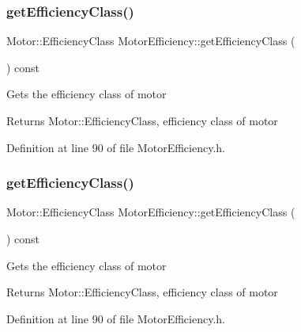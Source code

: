 \subsubsection{\texorpdfstring{get\+Efficiency\+Class()}{getEfficiencyClass()}\hspace{0.1cm}{\footnotesize\ttfamily [2/3]}}
{\footnotesize\ttfamily Motor\+::\+Efficiency\+Class Motor\+Efficiency\+::get\+Efficiency\+Class (\begin{DoxyParamCaption}{ }\end{DoxyParamCaption}) const\hspace{0.3cm}{\ttfamily [inline]}}

Gets the efficiency class of motor \begin{DoxyReturn}{Returns}
Motor\+::\+Efficiency\+Class, efficiency class of motor 
\end{DoxyReturn}


Definition at line 90 of file Motor\+Efficiency.\+h.

\mbox{\label{class_motor_efficiency_a9eb7d5c2fc598f655c1a3d12790e4d17}} 
\subsubsection{\texorpdfstring{get\+Efficiency\+Class()}{getEfficiencyClass()}\hspace{0.1cm}{\footnotesize\ttfamily [3/3]}}
{\footnotesize\ttfamily Motor\+::\+Efficiency\+Class Motor\+Efficiency\+::get\+Efficiency\+Class (\begin{DoxyParamCaption}{ }\end{DoxyParamCaption}) const\hspace{0.3cm}{\ttfamily [inline]}}

Gets the efficiency class of motor \begin{DoxyReturn}{Returns}
Motor\+::\+Efficiency\+Class, efficiency class of motor 
\end{DoxyReturn}


Definition at line 90 of file Motor\+Efficiency.\+h.

\mbox{\label{class_motor_efficiency_a9f88159c82daa270975d7969debe88a9}} 
